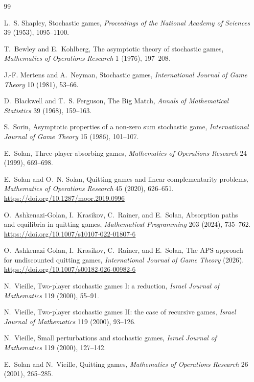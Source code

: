 \documentclass[11pt]{article}
\begin{document}
\begin{thebibliography}{99}

L.~S. Shapley, Stochastic games, \emph{Proceedings of the National Academy
of Sciences} 39 (1953), 1095--1100.

T.~Bewley and E.~Kohlberg, The asymptotic theory of stochastic games,
\emph{Mathematics of Operations Research} 1 (1976), 197--208.

J.-F. Mertens and A.~Neyman, Stochastic games,
\emph{International Journal of Game Theory} 10 (1981), 53--66.

D.~Blackwell and T.~S. Ferguson, The Big Match,
\emph{Annals of Mathematical Statistics} 39 (1968), 159--163.

S.~Sorin, Asymptotic properties of a non-zero sum stochastic game,
\emph{International Journal of Game Theory} 15 (1986), 101--107.

E.~Solan, Three-player absorbing games,
\emph{Mathematics of Operations Research} 24 (1999), 669--698.

E.~Solan and O.~N. Solan, Quitting games and linear complementarity problems,
\emph{Mathematics of Operations Research} 45 (2020), 626--651.
\url{https://doi.org/10.1287/moor.2019.0996}

O.~Ashkenazi-Golan, I.~Krasikov, C.~Rainer, and E.~Solan,
Absorption paths and equilibria in quitting games,
\emph{Mathematical Programming} 203 (2024), 735--762.
\url{https://doi.org/10.1007/s10107-022-01807-6}

O.~Ashkenazi-Golan, I.~Krasikov, C.~Rainer, and E.~Solan,
The APS approach for undiscounted quitting games,
\emph{International Journal of Game Theory} (2026).
\url{https://doi.org/10.1007/s00182-026-00982-6}

N.~Vieille, Two-player stochastic games I: a reduction,
\emph{Israel Journal of Mathematics} 119 (2000), 55--91.

N.~Vieille, Two-player stochastic games II: the case of recursive games,
\emph{Israel Journal of Mathematics} 119 (2000), 93--126.

N.~Vieille, Small perturbations and stochastic games,
\emph{Israel Journal of Mathematics} 119 (2000), 127--142.

E.~Solan and N.~Vieille, Quitting games,
\emph{Mathematics of Operations Research} 26 (2001), 265--285.


\end{thebibliography}
\end{document}
